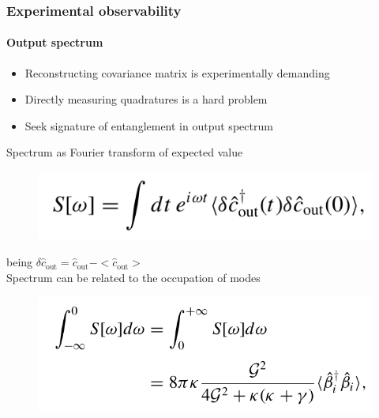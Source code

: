 \documentclass[aspectratio=43]{beamer}
\begin{document}
\begin{frame}
	
	\frametitle{Experimental observability}
	\framesubtitle{Output spectrum}
	
	\begin{itemize}
		\item Reconstructing covariance matrix is experimentally demanding
		\item Directly measuring quadratures is a hard problem
		\item Seek signature of entanglement in output spectrum
	\end{itemize}

	Spectrum as Fourier transform of expected value	
	\begin{figure}
		\includegraphics[width = 5.5 cm]{plots/spectrum_fourier.png}
	\end{figure}	

	being $\delta \hat{c}_{\textrm{out}} = \hat{c}_{\textrm{out}} - <\hat{c}_{\textrm{out}}>$ \\
	Spectrum can be related to the occupation of modes
	\begin{figure}
		\includegraphics[width = 7 cm]{plots/spectrum.png}
	\end{figure}	

\end{frame}
\end{document}
